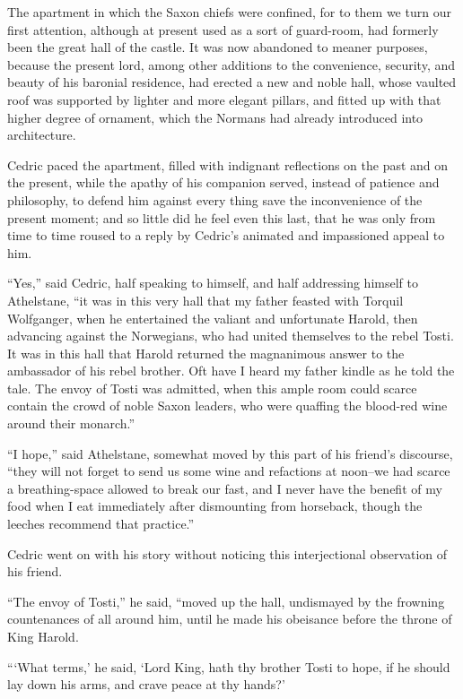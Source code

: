 The apartment in which the Saxon chiefs were confined, for to them we
turn our first attention, although at present used as a sort of
guard-room, had formerly been the great hall of the castle. It was now
abandoned to meaner purposes, because the present lord, among other
additions to the convenience, security, and beauty of his baronial
residence, had erected a new and noble hall, whose vaulted roof was
supported by lighter and more elegant pillars, and fitted up with that
higher degree of ornament, which the Normans had already introduced into
architecture.

Cedric paced the apartment, filled with indignant reflections on the
past and on the present, while the apathy of his companion served,
instead of patience and philosophy, to defend him against every thing
save the inconvenience of the present moment; and so little did he feel
even this last, that he was only from time to time roused to a reply by
Cedric's animated and impassioned appeal to him.

``Yes,'' said Cedric, half speaking to himself, and half addressing
himself to Athelstane, ``it was in this very hall that my father feasted
with Torquil Wolfganger, when he entertained the valiant and unfortunate
Harold, then advancing against the Norwegians, who had united themselves
to the rebel Tosti. It was in this hall that Harold returned the
magnanimous answer to the ambassador of his rebel brother. Oft have I
heard my father kindle as he told the tale. The envoy of Tosti was
admitted, when this ample room could scarce contain the crowd of noble
Saxon leaders, who were quaffing the blood-red wine around their
monarch.''

``I hope,'' said Athelstane, somewhat moved by this part of his friend's
discourse, ``they will not forget to send us some wine and refactions at
noon--we had scarce a breathing-space allowed to break our fast, and I
never have the benefit of my food when I eat immediately after
dismounting from horseback, though the leeches recommend that
practice.''

Cedric went on with his story without noticing this interjectional
observation of his friend.

``The envoy of Tosti,'' he said, ``moved up the hall, undismayed by the
frowning countenances of all around him, until he made his obeisance
before the throne of King Harold.

```What terms,' he said, `Lord King, hath thy brother Tosti to hope, if
he should lay down his arms, and crave peace at thy hands?'

